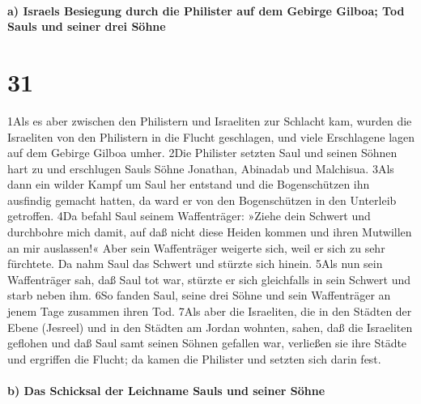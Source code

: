 \hypertarget{a-israels-besiegung-durch-die-philister-auf-dem-gebirge-gilboa-tod-sauls-und-seiner-drei-suxf6hne}{%
\paragraph{a) Israels Besiegung durch die Philister auf dem Gebirge
Gilboa; Tod Sauls und seiner drei
Söhne}\label{a-israels-besiegung-durch-die-philister-auf-dem-gebirge-gilboa-tod-sauls-und-seiner-drei-suxf6hne}}

\hypertarget{section-30}{%
\section{31}\label{section-30}}

1Als es aber zwischen den Philistern und Israeliten zur Schlacht kam,
wurden die Israeliten von den Philistern in die Flucht geschlagen, und
viele Erschlagene lagen auf dem Gebirge Gilboa umher. 2Die Philister
setzten Saul und seinen Söhnen hart zu und erschlugen Sauls Söhne
Jonathan, Abinadab und Malchisua. 3Als dann ein wilder Kampf um Saul her
entstand und die Bogenschützen ihn ausfindig gemacht hatten, da ward er
von den Bogenschützen in den Unterleib getroffen. 4Da befahl Saul seinem
Waffenträger: »Ziehe dein Schwert und durchbohre mich damit, auf daß
nicht diese Heiden kommen und ihren Mutwillen an mir auslassen!« Aber
sein Waffenträger weigerte sich, weil er sich zu sehr fürchtete. Da nahm
Saul das Schwert und stürzte sich hinein. 5Als nun sein Waffenträger
sah, daß Saul tot war, stürzte er sich gleichfalls in sein Schwert und
starb neben ihm. 6So fanden Saul, seine drei Söhne und sein Waffenträger
an jenem Tage zusammen ihren Tod. 7Als aber die Israeliten, die in den
Städten der Ebene (Jesreel) und in den Städten am Jordan wohnten, sahen,
daß die Israeliten geflohen und daß Saul samt seinen Söhnen gefallen
war, verließen sie ihre Städte und ergriffen die Flucht; da kamen die
Philister und setzten sich darin fest.

\hypertarget{b-das-schicksal-der-leichname-sauls-und-seiner-suxf6hne}{%
\paragraph{b) Das Schicksal der Leichname Sauls und seiner
Söhne}\label{b-das-schicksal-der-leichname-sauls-und-seiner-suxf6hne}}

